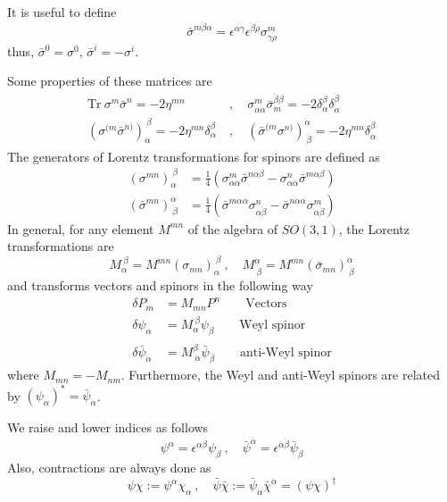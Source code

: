 \documentclass[a4paper,12pt]{article}
\numberwithin{equation}{section}
\numberwithin{exe}{section}
\renewcommand{\a}{{\alpha}}
\newcommand{\ad}{{\dot\alpha}}
\renewcommand{\b}{{\beta}}
\newcommand{\bd}{{\dot\beta}}
\newcommand{\g}{{\gamma}}
\renewcommand{\d}{{\delta}}
\newcommand{\e}{{\epsilon}}
\newcommand{\s}{{\sigma}}
\renewcommand{\sb}{{\bar\sigma}}
\newcommand{\chib}{{\bar\chi}}
\newcommand{\psib}{{\bar\psi}}
\begin{document}
It is useful to define
	\begin{equation}
	\sb^{m\bd\a} = \e^{\a\g}\e^{\bd\dot{\rho}}\s^m_{\g\dot{\rho}}
	\end{equation}
thus, $\sb^0 = \s^0$, $\sb^i = -\s^i$.

Some properties of these matrices are
	\begin{equation}
		\begin{aligned}
		\text{Tr}\ \s^m \sb^n = -2\eta^{mn}\ &,\quad \s^m_{\a\ad} \sb_m^{\bd\b} = -2\d^\b_\a \d^\bd_\ad \\
		(\s^{(m}\sb^{n)})_\a^{\ \b} = -2\eta^{mn} \d^\b_\a\ &,\quad (\sb^{(m}\s^{n)})^{\ad}_{\ \bd} = -2\eta^{mn} \d^\bd_\ad
		\end{aligned}
	\end{equation}
The generators of Lorentz transformations for spinors are defined as
	\begin{align}
	(\s^{mn})_\a^{\ \b} & = \frac14 (\s^{m}_{\a\ad} \sb^{n\ad\b} - \s^{n}_{\a\ad} \sb^{m \ad\b})\\
	(\sb^{mn})^\ad_{\ \bd} & = \frac14 (\sb^{m\ad\a} \s^{n}_{\a\bd} - \sb^{n\ad\a} \s^m_{\a\bd})
	\end{align}
In general, for any element $M^{mn}$ of the algebra of $SO(3,1)$, the Lorentz transformations are
	\begin{equation}
	M_\a^{\ \b} = M^{mn}(\s_{mn})_\a^{\ \b}\ ,\quad M^\ad_{\ \bd} = M^{mn} (\sb_{mn})^\ad_{\ \bd}
	\end{equation}
and transforms vectors and spinors in the following way
	\begin{align}
	\d P_m & = M_{mn} P^n\qquad \text{Vectors} \\
	\d \psi_\a & = M_\a^{\ \b} \psi_\b\qquad \text{Weyl spinor} \\
	\d \psib_\ad & = M^\bd_{\ \ad} \psib_\bd\qquad \text{anti-Weyl spinor}
	\end{align}
where $M_{mn} = - M_{nm}$. Furthermore, the Weyl and anti-Weyl spinors are related by $(\psi_\a)^* = \psib_\ad$.

We raise and lower indices as follows
	\begin{equation}
	\psi^\a = \e^{\a\b} \psi_\b\ ,\quad \psib^\ad = \e^{\ad\bd} \psib_\bd
	\end{equation}
Also, contractions are always done as
	\begin{equation}
	\psi\chi := \psi^\a \chi_\a\ ,\quad \psib\chib := \psib_\ad \chib^\ad = (\psi\chi)^\dagger
	\end{equation}
\end{document}

